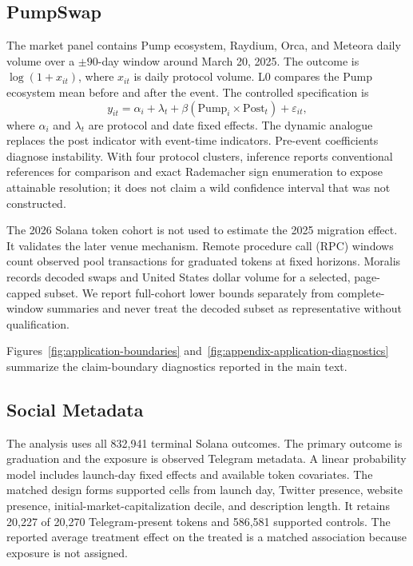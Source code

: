 \documentclass{article}
\begin{document}
\subsection{PumpSwap}

The market panel contains Pump ecosystem, Raydium, Orca, and Meteora daily volume over a $\pm90$-day window around March 20, 2025. The outcome is $\log(1+x_{it})$, where $x_{it}$ is daily protocol volume. L0 compares the Pump ecosystem mean before and after the event. The controlled specification is
\[
  y_{it}=\alpha_i+\lambda_t+\beta(\mathrm{Pump}_i\times\mathrm{Post}_t)+\varepsilon_{it},
\]
where $\alpha_i$ and $\lambda_t$ are protocol and date fixed effects. The dynamic analogue replaces the post indicator with event-time indicators. Pre-event coefficients diagnose instability. With four protocol clusters, inference reports conventional references for comparison and exact Rademacher sign enumeration to expose attainable resolution; it does not claim a wild confidence interval that was not constructed.

The 2026 Solana token cohort is not used to estimate the 2025 migration effect. It validates the later venue mechanism. Remote procedure call (RPC) windows count observed pool transactions for graduated tokens at fixed horizons. Moralis records decoded swaps and United States dollar volume for a selected, page-capped subset. We report full-cohort lower bounds separately from complete-window summaries and never treat the decoded subset as representative without qualification.

Figures~\ref{fig:application-boundaries} and~\ref{fig:appendix-application-diagnostics} summarize the claim-boundary diagnostics reported in the main text.

\subsection{Social Metadata}

The analysis uses all 832,941 terminal Solana outcomes. The primary outcome is graduation and the exposure is observed Telegram metadata. A linear probability model includes launch-day fixed effects and available token covariates. The matched design forms supported cells from launch day, Twitter presence, website presence, initial-market-capitalization decile, and description length. It retains 20,227 of 20,270 Telegram-present tokens and 586,581 supported controls. The reported average treatment effect on the treated is a matched association because exposure is not assigned.
\end{document}
